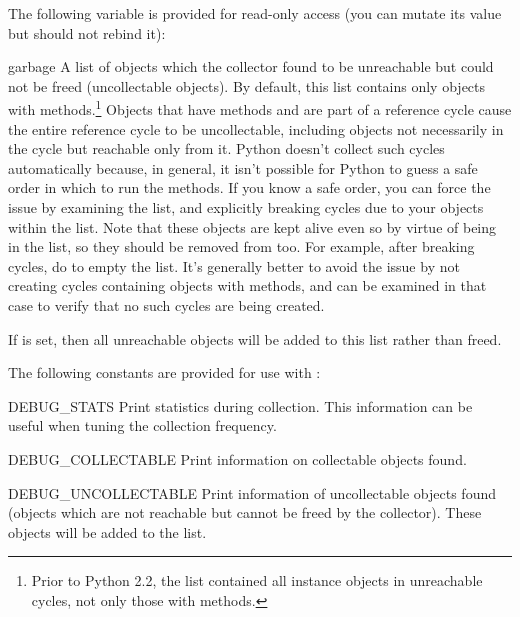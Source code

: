 The following variable is provided for read-only access (you can
mutate its value but should not rebind it):

\begin{datadesc}{garbage}
A list of objects which the collector found to be unreachable
but could not be freed (uncollectable objects).  By default, this list
contains only objects with  methods.\footnote{Prior to
  Python 2.2, the list contained all instance objects in unreachable
  cycles,  not only those with  methods.}
Objects that have
 methods and are part of a reference cycle cause
the entire reference cycle to be uncollectable, including objects
not necessarily in the cycle but reachable only from it.  Python doesn't
collect such cycles automatically because, in general, it isn't possible
for Python to guess a safe order in which to run the 
methods.  If you know a safe order, you can force the issue by examining
the  list, and explicitly breaking cycles due to your
objects within the list.  Note that these objects are kept alive even
so by virtue of being in the  list, so they should be
removed from  too.  For example, after breaking cycles, do
 to empty the list.  It's generally better
to avoid the issue by not creating cycles containing objects with
 methods, and  can be examined in that
case to verify that no such cycles are being created.

If  is set, then all unreachable objects will
be added to this list rather than freed.
\end{datadesc}


The following constants are provided for use with
:

\begin{datadesc}{DEBUG_STATS}
Print statistics during collection.  This information can
be useful when tuning the collection frequency.
\end{datadesc}

\begin{datadesc}{DEBUG_COLLECTABLE}
Print information on collectable objects found.
\end{datadesc}

\begin{datadesc}{DEBUG_UNCOLLECTABLE}
Print information of uncollectable objects found (objects which are
not reachable but cannot be freed by the collector).  These objects
will be added to the  list.
\end{datadesc}

